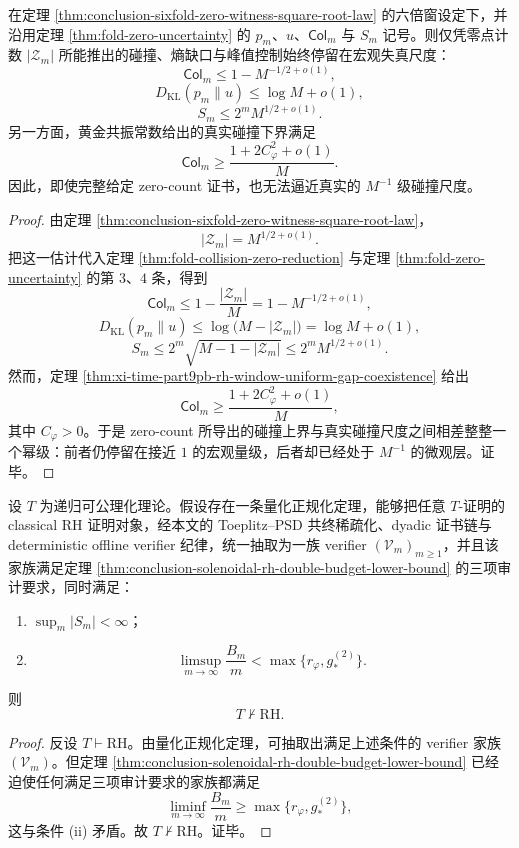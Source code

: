 \begin{theorem}[零点计数证书的碰撞盲性]\label{thm:conclusion-zero-count-collision-blindness}
在定理 \ref{thm:conclusion-sixfold-zero-witness-square-root-law} 的六倍窗设定下，并沿用定理 \ref{thm:fold-zero-uncertainty} 的 \(p_m\)、\(u\)、\(\mathsf{Col}_m\) 与 \(S_m\) 记号。则仅凭零点计数 \(|\mathcal Z_m|\) 所能推出的碰撞、熵缺口与峰值控制始终停留在宏观失真尺度：
\[
\mathsf{Col}_m\le 1-M^{-1/2+o(1)},
\]
\[
D_{\mathrm{KL}}(p_m\|u)\le \log M+o(1),
\]
\[
S_m\le 2^mM^{1/2+o(1)}.
\]
另一方面，黄金共振常数给出的真实碰撞下界满足
\[
\mathsf{Col}_m\ge \frac{1+2C_\varphi^2+o(1)}{M}.
\]
因此，即使完整给定 zero-count 证书，也无法逼近真实的 \(M^{-1}\) 级碰撞尺度。
\end{theorem}
\begin{proof}
由定理 \ref{thm:conclusion-sixfold-zero-witness-square-root-law}，
\[
|\mathcal Z_m|=M^{1/2+o(1)}.
\]
把这一估计代入定理 \ref{thm:fold-collision-zero-reduction} 与定理 \ref{thm:fold-zero-uncertainty} 的第 \(3\)、\(4\) 条，得到
\[
\mathsf{Col}_m
\le
1-\frac{|\mathcal Z_m|}{M}
=
1-M^{-1/2+o(1)},
\]
\[
D_{\mathrm{KL}}(p_m\|u)
\le
\log\!\bigl(M-|\mathcal Z_m|\bigr)
=
\log M+o(1),
\]
\[
S_m
\le
2^m\sqrt{M-1-|\mathcal Z_m|}
\le
2^mM^{1/2+o(1)}.
\]
然而，定理 \ref{thm:xi-time-part9pb-rh-window-uniform-gap-coexistence} 给出
\[
\mathsf{Col}_m
\ge
\frac{1+2C_\varphi^2+o(1)}{M},
\]
其中 \(C_\varphi>0\)。于是 zero-count 所导出的碰撞上界与真实碰撞尺度之间相差整整一个幂级：前者仍停留在接近 \(1\) 的宏观量级，后者却已经处于 \(M^{-1}\) 的微观层。证毕。
\end{proof}

\begin{theorem}\label{thm:conclusion-solenoidal-rh-quantitative-normalization-independence}
设 \(T\) 为递归可公理化理论。假设存在一条量化正规化定理，能够把任意 \(T\)-证明的 classical RH 证明对象，经本文的 Toeplitz--PSD 共终稀疏化、dyadic 证书链与 deterministic offline verifier 纪律，统一抽取为一族 verifier \((\mathcal V_m)_{m\ge 1}\)，并且该家族满足定理 \ref{thm:conclusion-solenoidal-rh-double-budget-lower-bound} 的三项审计要求，同时满足：
\begin{enumerate}
  \item[(i)] \(\sup_m |S_m|<\infty\)；
  \item[(ii)]
  \[
  \limsup_{m\to\infty}\frac{B_m}{m}
  <
  \max\!\bigl\{r_\varphi,g_*^{(2)}\bigr\}.
  \]
\end{enumerate}
则
\[
T\nvdash \mathrm{RH}.
\]
\end{theorem}
\begin{proof}
反设 \(T\vdash \mathrm{RH}\)。由量化正规化定理，可抽取出满足上述条件的 verifier 家族 \((\mathcal V_m)\)。但定理 \ref{thm:conclusion-solenoidal-rh-double-budget-lower-bound} 已经迫使任何满足三项审计要求的家族都满足
\[
\liminf_{m\to\infty}\frac{B_m}{m}\ge \max\!\bigl\{r_\varphi,g_*^{(2)}\bigr\},
\]
这与条件 (ii) 矛盾。故 \(T\nvdash \mathrm{RH}\)。证毕。
\end{proof}

